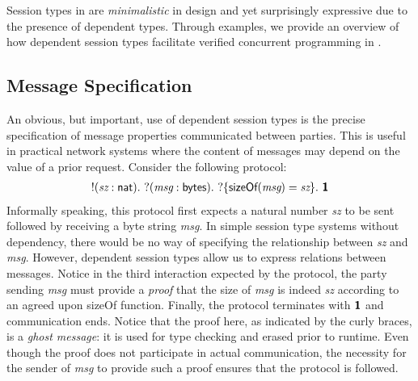 Session types in \TLLC{} are \emph{minimalistic} in design and yet surprisingly expressive
due to the presence of dependent types. Through examples, we provide an overview of
how dependent session types facilitate verified concurrent programming in \TLLC{}.

\subsection{Message Specification}\label{sec:message-specification}
An obvious, but important, use of dependent session types is the precise specification
of message properties communicated between parties. This is useful in practical network
systems where the content of messages may depend on the value of a prior request.
Consider the following protocol:
\begin{align*}
  !(\textit{sz}: \textsf{nat}).\
  ?(\textit{msg}: \textsf{bytes}).\ ?\{\textsf{sizeOf}(\textit{msg}) = \textit{sz}\}.\ \textbf{\textsf{1}}
\end{align*}
Informally speaking, this protocol first expects a natural number \textit{sz} to be sent
followed by receiving a byte string \textit{msg}. In simple session type systems without
dependency, there would be no way of specifying the relationship between \textit{sz} and
\textit{msg}. However, dependent session types allow us to express relations between messages.
Notice in the third interaction expected by the protocol, the party sending \textit{msg} must
provide a \emph{proof} that the size of \textit{msg} is indeed \textit{sz} according to
an agreed upon \textsf{sizeOf} function. Finally, the protocol terminates with $\textbf{\textsf{1}}$ and
communication ends. Notice that the proof here, as indicated by the curly braces, is a
\emph{ghost message}: it is used for type checking and erased prior to runtime. Even though
the proof does not participate in actual communication, the necessity for the sender of
\textit{msg} to provide such a proof ensures that the protocol is followed.

